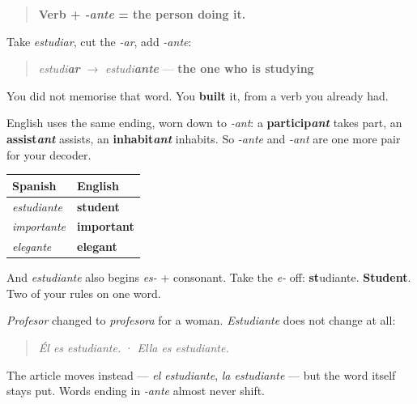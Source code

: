 \begin{grammarlens}[title={Grammar Lens: the one who is doing it}]
\begin{quote}
\textbf{Verb + \emph{-ante} = the person doing it.}
\end{quote}

Take \emph{estudiar}, cut the \emph{-ar}, add \emph{-ante}:

\begin{quote}
\emph{estudi\textbf{ar}} $\to$ \emph{estudi\textbf{ante}} — \textbf{the one who is studying}
\end{quote}

You did not memorise that word. You \textbf{built} it, from a verb you already had.

English uses the same ending, worn down to \emph{-ant}: a \textbf{particip\emph{ant}} takes part, an \textbf{assist\emph{ant}} assists, an \textbf{inhabit\emph{ant}} inhabits. So \emph{-ante} and \emph{-ant} are one more pair for your decoder.

\noindent
\begin{tabularx}{\linewidth}{@{}>{\raggedright\arraybackslash}X>{\raggedright\arraybackslash}X@{}}
\toprule
\textbf{Spanish} & \textbf{English} \\
\midrule
\emph{estudiante} & \textbf{student} \\
\emph{importante} & \textbf{important} \\
\emph{elegante} & \textbf{elegant} \\
\bottomrule
\end{tabularx}

And \emph{estudiante} also begins \emph{es-} + consonant. Take the \emph{e-} off: \textbf{st}udiante. \textbf{Student}. Two of your rules on one word.
\end{grammarlens}

\begin{grammarlens}[title={Grammar Lens: one word, either person}]
\emph{Profesor} changed to \emph{profesora} for a woman. \emph{Estudiante} does not change at all:

\begin{quote}
\emph{Él es estudiante.}  ·  \emph{Ella es estudiante.}
\end{quote}

The article moves instead — \emph{el estudiante}, \emph{la estudiante} — but the word itself stays put. Words ending in \emph{-ante} almost never shift.
\end{grammarlens}

